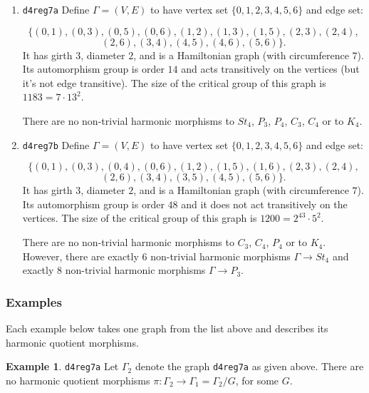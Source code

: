 \documentclass[12pt,letterpaper]{article}
\theoremstyle{definition}
\newtheorem{example}[theorem]{Example}
\begin{document}
\begin{enumerate}
\item
  {\tt d4reg7a}
Define $\Gamma=(V,E)$ to have vertex set $\{0,1,2,3,4,5,6\}$ and edge set:

\[
\{(0, 1), (0, 3), (0, 5), (0, 6), (1, 2), (1, 3), (1, 5), (2, 3), (2, 4),
\]
\[
(2, 6), (3, 4), (4, 5), (4, 6), (5, 6)\}.
\]
It has girth $3$, diameter $2$, and is a
Hamiltonian graph (with circumference $7$).
Its automorphism group is order $14$ and acts transitively on the vertices
(but it's not edge transitive).
The size of the critical group of this graph is $1183=7\cdot 13^2$.

There are no non-trivial harmonic morphisms to $St_4$, $P_3$, $P_4$, $C_3$, $C_4$ or to $K_4$.

\item
{\tt d4reg7b}
Define $\Gamma=(V,E)$ to have vertex set $\{0,1,2,3,4,5,6\}$ and edge set:

\[
\{
(0, 1), (0, 3), (0, 4), (0, 6), (1, 2), (1, 5), (1, 6), (2, 3), (2, 4),
\]
\[
(2, 6), (3, 4), (3, 5), (4, 5), (5, 6)
\}.
\]
It has girth $3$, diameter $2$, and is a
Hamiltonian graph (with circumference $7$).
Its automorphism group is order $48$ and it does not act transitively on the vertices.
The size of the critical group of this graph is $1200=2^43\cdot 5^2$.

There are no non-trivial harmonic morphisms to $C_3$, $C_4$, $P_4$ or to $K_4$.
However, there are exactly $6$ non-trivial harmonic morphisms $\Gamma\to St_4$
and exactly $8$ non-trivial harmonic morphisms $\Gamma\to P_3$.

\end{enumerate}



\subsubsection{Examples}

Each example below takes one graph from the list above and describes
its harmonic quotient morphisms.


\begin{example}%
\label{example:d4reg7a}
 {\tt d4reg7a}\newline
{\rm  
  Let $\Gamma_2$ denote the graph {\tt d4reg7a} as given above.
There are no harmonic quotient morphisms
$\pi: \Gamma_2\to \Gamma_1=\Gamma_2/G$,
for some $G$.
}
\end{example}
  
\end{document}
